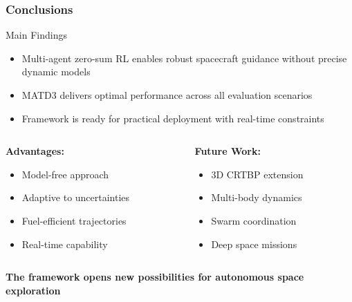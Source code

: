 \documentclass[
    11pt, %
    aspectratio=169, %
]{beamer}
\begin{document}
\begin{frame}
	\frametitle{Conclusions}
	
	\begin{block}{Main Findings}
		\begin{itemize}
			\item Multi-agent zero-sum RL enables robust spacecraft guidance without precise dynamic models
			\item MATD3 delivers optimal performance across all evaluation scenarios
			\item Framework is ready for practical deployment with real-time constraints
		\end{itemize}
	\end{block}
	
	\begin{columns}[t]
		\begin{column}{0.5\textwidth}
			\textbf{Advantages:}
			\begin{itemize}
				\item Model-free approach
				\item Adaptive to uncertainties
				\item Fuel-efficient trajectories
				\item Real-time capability
			\end{itemize}
		\end{column}
		\begin{column}{0.5\textwidth}
			\textbf{Future Work:}
			\begin{itemize}
				\item 3D CRTBP extension
				\item Multi-body dynamics
				\item Swarm coordination
				\item Deep space missions
			\end{itemize}
		\end{column}
	\end{columns}
	
	\vspace{0.3cm}
	\begin{center}
		\textbf{The framework opens new possibilities for autonomous space exploration}
	\end{center}
\end{frame}

\end{document}
